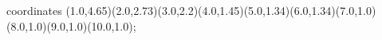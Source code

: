 					coordinates { (1.0,4.65)(2.0,2.73)(3.0,2.2)(4.0,1.45)(5.0,1.34)(6.0,1.34)(7.0,1.0)(8.0,1.0)(9.0,1.0)(10.0,1.0)};